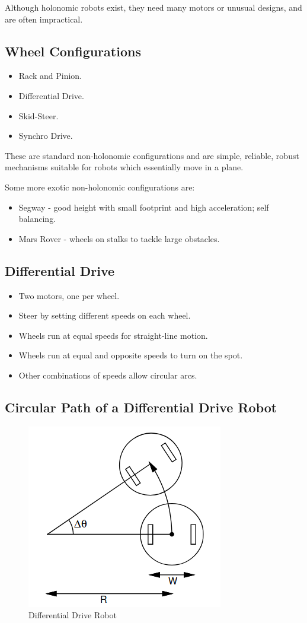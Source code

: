 \documentclass[11pt]{article}
\begin{document}
Although holonomic robots exist, they need many motors or unusual designs, and are often impractical.

\subsection{Wheel Configurations}
\begin{itemize}
  \item Rack and Pinion.
  \item Differential Drive.
  \item Skid-Steer.
  \item Synchro Drive.
\end{itemize}
These are standard non-holonomic configurations and are simple, reliable, robust mechanisms suitable for robots which essentially move in a plane.

Some more exotic non-holonomic configurations are:
\begin{itemize}
  \item Segway - good height with small footprint and high acceleration; self balancing.
  \item Mars Rover - wheels on stalks to tackle large obstacles.
\end{itemize}

\subsection{Differential Drive}
\begin{itemize}
  \item Two motors, one per wheel.
  \item Steer by setting different speeds on each wheel.
  \item Wheels run at equal speeds for straight-line motion.
  \item Wheels run at equal and opposite speeds to turn on the spot.
  \item Other combinations of speeds allow circular arcs.
\end{itemize}

\subsection{Circular Path of a Differential Drive Robot}
\begin{figure}[h]
  \caption{Differential Drive Robot}
  \includegraphics[scale=0.4]{ddrobot}
  \centering
\end{figure}
\end{document}
